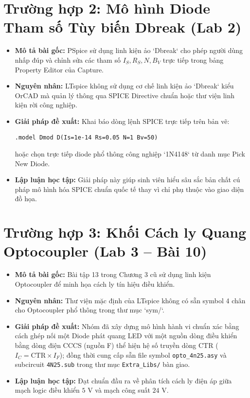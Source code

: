 \documentclass[12pt,a4paper]{report}
\begin{document}
\section{Trường hợp 2: Mô hình Diode Tham số Tùy biến Dbreak (Lab 2)}
\begin{itemize}
    \item \textbf{Mô tả bài gốc:} PSpice sử dụng linh kiện ảo `Dbreak` cho phép người dùng nhấp đúp và chỉnh sửa các tham số $I_S, R_S, N, B_V$ trực tiếp trong bảng Property Editor của Capture.
    \item \textbf{Nguyên nhân:} LTspice không sử dụng cơ chế linh kiện ảo `Dbreak` kiểu OrCAD mà quản lý thông qua SPICE Directive chuẩn hoặc thư viện linh kiện rời công nghiệp.
    \item \textbf{Giải pháp đề xuất:} Khai báo dòng lệnh SPICE trực tiếp trên bản vẽ:
    \begin{lstlisting}[language=TeX]
.model Dmod D(Is=1e-14 Rs=0.05 N=1 Bv=50)
    \end{lstlisting}
    hoặc chọn trực tiếp diode phổ thông công nghiệp `1N4148` từ danh mục Pick New Diode.
    \item \textbf{Lập luận học tập:} Giải pháp này giúp sinh viên hiểu sâu sắc bản chất cú pháp mô hình hóa SPICE chuẩn quốc tế thay vì chỉ phụ thuộc vào giao diện đồ họa.
\end{itemize}

\section{Trường hợp 3: Khối Cách ly Quang Optocoupler (Lab 3 -- Bài 10)}
\begin{itemize}
    \item \textbf{Mô tả bài gốc:} Bài tập 13 trong Chương 3 cũ sử dụng linh kiện Optocoupler để minh họa cách ly tín hiệu điều khiển.
    \item \textbf{Nguyên nhân:} Thư viện mặc định của LTspice không có sẵn symbol 4 chân cho Optocoupler phổ thông trong thư mục `sym/`.
    \item \textbf{Giải pháp đề xuất:} Nhóm đã xây dựng mô hình hành vi chuẩn xác bằng cách ghép nối một Diode phát quang LED với một nguồn dòng điều khiển bằng dòng điện CCCS (nguồn F) thể hiện hệ số truyền dòng CTR ($I_C = \text{CTR} \times I_F$); đồng thời cung cấp sẵn file symbol \texttt{opto\_4n25.asy} và subcircuit \texttt{4N25.sub} trong thư mục \texttt{Extra\_Libs/} bàn giao.
    \item \textbf{Lập luận học tập:} Đạt chuẩn đầu ra về phân tích cách ly điện áp giữa mạch logic điều khiển $5\text{ V}$ và mạch công suất $24\text{ V}$.
\end{itemize}
\end{document}
